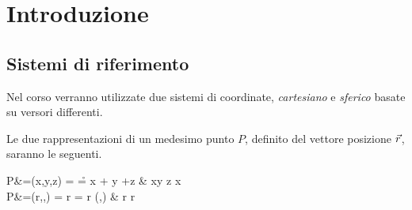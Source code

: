 \chapter{Introduzione}
\section{Sistemi di riferimento}
Nel corso verranno utilizzate due sistemi di coordinate, \emph{cartesiano} e \emph{sferico} basate su versori differenti.

Le due rappresentazioni di un medesimo punto $P$, definito del vettore posizione $\vec{r}$, saranno le seguenti.
\begin{esp}
	P&=(x,y,z) = \r = x \cdot {} + y \cdot {} +z \cdot {}
	&  x\perp y \perp z \perp x \\
	P&=(r,\theta,\phi) = r \cdot {} = r \cdot {}(\theta,\phi)
		&  r \perp \theta \perp \phi \perp r
	\label{eq:riferimento}
\end{esp}


